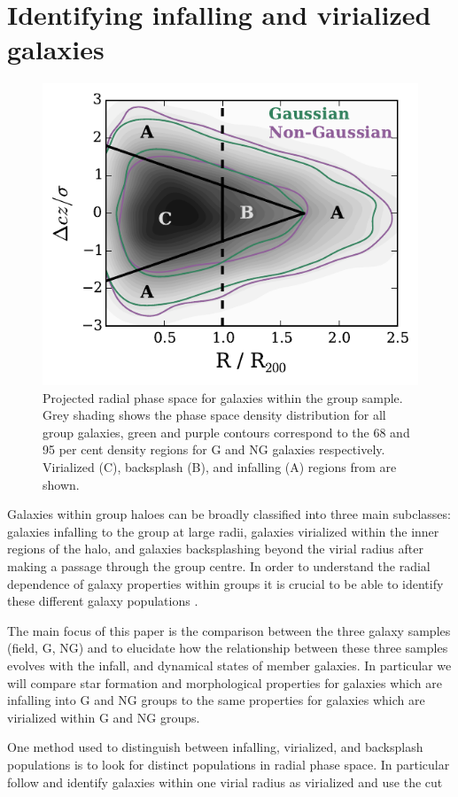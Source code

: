 \documentclass[a4paper,fleqn,usenatbib]{mnras}
\begin{document}

\section{Identifying infalling and virialized galaxies}
\label{sec:rad_div}

\begin{figure}
  \centering
  \includegraphics[width=\columnwidth]{vnorm_r_con.pdf}
  \caption{Projected radial phase space
    for galaxies within the group sample.  Grey shading shows the phase
    space density distribution for all group galaxies, green and
    purple contours correspond to the 68 and 95 per cent density
    regions for G and NG galaxies respectively. Virialized (C),
    backsplash (B), and infalling (A) regions from
    \citet{mahajan2011} are shown.}
  \label{fig:vnorm_r}
\end{figure}

Galaxies within group haloes can be broadly classified into three main
subclasses: galaxies infalling to the group at large radii, galaxies
virialized within the inner regions of the halo, and galaxies
backsplashing beyond the virial radius after making a passage through
the group centre.  In order to understand the radial dependence of
galaxy properties within groups it is crucial to be able to
identify these different galaxy populations
\citep{gill2005, mahajan2011, pimbblet2011, haines2015, noble2016}.
\par
The main focus of this paper is the comparison between the three
galaxy samples (field, G, NG) and to elucidate how the relationship
between these three samples evolves with the infall, and dynamical
states of member
galaxies.  In particular we will compare star formation and
morphological properties for galaxies which are infalling into G and
NG groups to the same properties for galaxies which are virialized
within G and NG groups.
\par
One method used to distinguish between infalling, virialized, and
backsplash populations is to look for distinct populations in radial
phase space.  In particular \citet{mahajan2011} follow
\citet{sanchis2004} and identify galaxies within one virial radius as
virialized and use the cut
\end{document}

